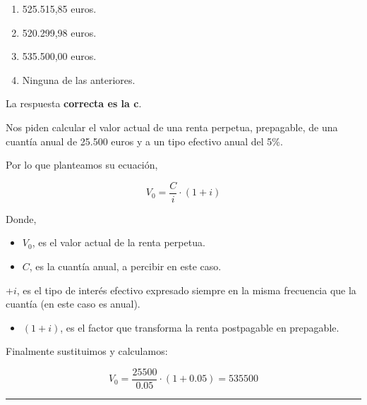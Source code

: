 \documentclass[
  letterpaper,
  DIV=11,
  numbers=noendperiod]{scrreprt}
\providecommand{\tightlist}{%
  \setlength{\itemsep}{0pt}\setlength{\parskip}{0pt}}\usepackage{longtable,booktabs,array}
\begin{document}
\begin{enumerate}
\def\labelenumi{\alph{enumi})}
\item
  525.515,85 euros.
\item
  520.299,98 euros.
\item
  535.500,00 euros.
\item
  Ninguna de las anteriores.
\end{enumerate}

\begin{tcolorbox}[enhanced jigsaw, left=2mm, opacityback=0, colback=white, breakable, arc=.35mm, bottomrule=.15mm, rightrule=.15mm, toprule=.15mm, leftrule=.75mm, colframe=quarto-callout-tip-color-frame]
\begin{minipage}[t]{5.5mm}
\textcolor{quarto-callout-tip-color}{\faLightbulb}
\end{minipage}%
\begin{minipage}[t]{\textwidth - 5.5mm}

La respuesta \textbf{correcta es la c}.

Nos piden calcular el valor actual de una renta perpetua, prepagable, de
una cuantía anual de 25.500 euros y a un tipo efectivo anual del 5\%.

Por lo que planteamos su ecuación,

\[V_0=\frac{C}{i}\cdot(1+i)\]

Donde,

\begin{itemize}
\item
  \(V_0\), es el valor actual de la renta perpetua.
\item
  \(C\), es la cuantía anual, a percibir en este caso.
\end{itemize}

+\(i\), es el tipo de interés efectivo expresado siempre en la misma
frecuencia que la cuantía (en este caso es anual).

\begin{itemize}
\tightlist
\item
  \((1+i)\), es el factor que transforma la renta postpagable en
  prepagable.
\end{itemize}

Finalmente sustituimos y calculamos:

\[V_0=\frac{25500}{0.05}\cdot(1+0.05)=535500\]

\end{minipage}%
\end{tcolorbox}

\begin{center}\rule{0.5\linewidth}{0.5pt}\end{center}
\end{document}
